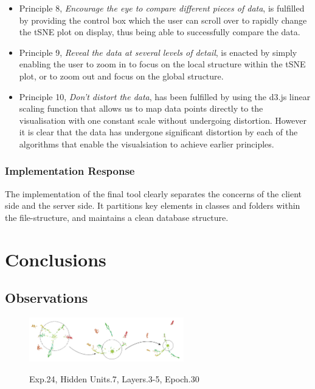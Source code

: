 \documentclass[a4paper,11pt,titlepage]{article}
\begin{document}
\begin{itemize}
		\item Principle 8, \textit{Encourage the eye to compare different pieces of data}, is fulfilled by providing the control box which the user can scroll over to rapidly change the tSNE plot on display, thus being able to successfully compare the data.
		\item Principle 9, \textit{Reveal the data at several levels of detail}, is enacted by simply enabling the user to zoom in to focus on the local structure within the tSNE plot, or to zoom out and focus on the global structure.
		\item Principle 10, \textit{Don't distort the data}, has been fulfilled by using the d3.js linear scaling function that allows us to map data points directly to the visualisation with one constant scale without undergoing distortion. However it is clear that the data has undergone significant distortion by each of the algorithms that enable the visualsiation to achieve earlier principles.
	\end{itemize}
	
	\subsubsection{Implementation Response}
	The implementation of the final tool clearly separates the concerns of the client side and the server side. It partitions key elements in classes and folders within the file-structure, and maintains a clean database structure.
	
\clearpage 

\section{Conclusions}
	
	\subsection{Observations}
	\begin{figure}[H]
    			\centering	
			{{\includegraphics[width=0.6\textwidth]
    				{img/conc_X24_H7_L1-3-5_E30.png} 
    			}}%
    			\caption{Exp.24, Hidden Units.7, Layers.3-5, Epoch.30}%
    		\label{fig:mnistHinton}
	\end{figure}
\end{document}
